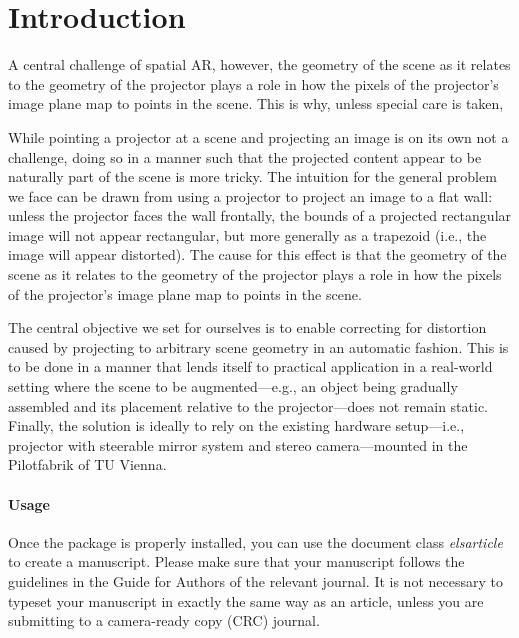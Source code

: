 \documentclass[review]{elsarticle}
\begin{document}
\linenumbers

\section{Introduction}



A central challenge of spatial AR, however,  the geometry of the scene as it relates to the geometry of the projector plays a role in how the pixels of the projector’s image plane map to points in the scene. This is why, unless special care is taken, 

While pointing a projector at a scene and projecting an image is on its own not a challenge, doing so in a manner such that the projected content appear to be naturally part of the scene is more tricky. The intuition for the general problem we face can be drawn from using a projector to project an image to a flat wall: unless the projector faces the wall frontally, the bounds of a projected rectangular image will not appear rectangular, but more generally as a trapezoid (i.e., the image will appear distorted). The cause for this effect is that the geometry of the scene as it relates to the geometry of the projector plays a role in how the pixels of the projector’s image plane map to points in the scene.

The central objective we set for ourselves is to enable correcting for distortion caused by projecting to arbitrary scene geometry in an automatic fashion. This is to be done in a manner that lends itself to practical application in a real-world setting where the scene to be augmented—e.g., an object being gradually assembled and its placement relative to the projector—does not remain static. Finally, the solution is ideally to rely on the existing hardware setup—i.e., projector with steerable mirror system and stereo camera—mounted in the Pilotfabrik  of TU Vienna.

\paragraph{Usage} Once the package is properly installed, you can use the document class \emph{elsarticle} to create a manuscript. Please make sure that your manuscript follows the guidelines in the Guide for Authors of the relevant journal. It is not necessary to typeset your manuscript in exactly the same way as an article, unless you are submitting to a camera-ready copy (CRC) journal.
\end{document}
